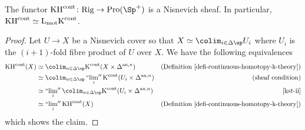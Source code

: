 \documentclass[colorinlistoftodos,article,11pt,reqno]{article}
\newcommand{\Rig}{\textup{Rig}}
\newcommand{\Pro}{\textup{Pro}}
\newcommand{\an}{\textup{an}}
\newcommand{\K}{\textup{K}}
\newcommand{\Kcont}{\K^\textup{cont}}
\newcommand{\KHcont}{\textup{KH}^\textup{cont}}
\renewcommand{\to}[1][]{\overset{#1}{\rightarrow}}
\DeclareMathOperator*{\prolim}{``lim''}
\renewcommand{\L}{\textup{L}}
\newcommand{\Lmot}{\L_{\textup{mot}}}
\begin{document}
\begin{lem} \label{lem--KHcont-is-Nisnevich-sheaf}
The functor $\KHcont \colon \Rig\to\Pro(\Sp^+)$ is a Nisnevich sheaf. In particular, $\KHcont \simeq \Lmot\Kcont$.
\end{lem}
\begin{proof}
Let $U\to X$ be a Nisnevich cover so that $X\simeq\colim_{i\in\Delta\op}U_i$ where $U_i$ is the $(i+1)$-fold fibre product of $U$ over $X$. We have the following equivalences
\begin{align*}
\KHcont(X)
&\simeq \colim_{n\in\Delta\op} \Kcont(X\times \Delta^{\an,n}) 
& (\textup{Definition}~\ref{defi-continuous-homotopy-k-theory}) \\
&\simeq \colim_{n\in\Delta\op} \prolim_i \Kcont(U_i\times\Delta^{\an,n}) 
& (\textup{sheaf condition}) \\
&\simeq \prolim_i \colim_{n\in\Delta\op} \Kcont(U_i\times\Delta^{\an,n}) 
& \cite[\textup{Cor.}~2.9]{kst-ii} \\
& \simeq \prolim_i \KHcont(X)
& (\textup{Definition}~\ref{defi-continuous-homotopy-k-theory})
\end{align*}
which shows the claim.
\end{proof}
\end{document}
